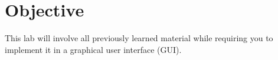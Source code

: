 \section{Objective}

This lab will involve all previously learned material while requiring you to implement it in a graphical user interface (GUI).
